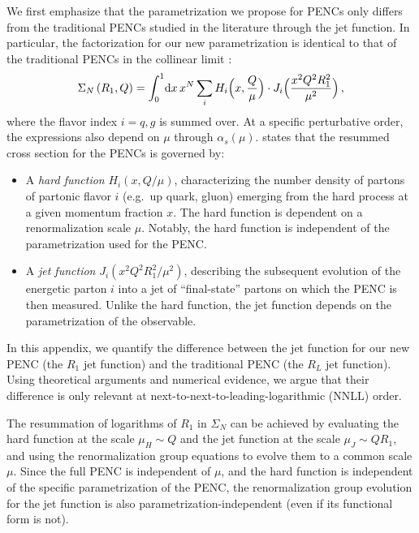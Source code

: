 We first emphasize that the parametrization we propose for PENCs only differs from the traditional PENCs studied in the literature through the jet function.
%
In particular, the factorization for our new parametrization is identical to that of the traditional PENCs in the collinear limit \cite{Dixon:2019uzg, Chen:2020vvp}:
\begin{align} \label{eq:fact}
    \Sigma_N
    \left(
    R_1, Q
    \right)
    =
    \int_0^1\!
    \dd x\,
    x^N
    \sum_i H_i
    \Bigl(x,\frac{Q}{\mu}\Bigr) \cdot
    J_i
    \Bigl( \frac{x^2 Q^2R_1^2}{\mu^2} \Bigr)
    \,,
\end{align}
where the flavor index \(i = q,g\)  is summed over.
%
At a specific perturbative order, the expressions also depend on $\mu$ through $\alpha_s(\mu)$.
%
 states that the resummed cross section for the PENCs %
is governed by:
\begin{itemize}
    \item
    A \textit{hard function} \(H_i(x, Q/\mu)\), characterizing the number density of partons of partonic flavor \(i\) (e.g.\ up quark, gluon) emerging from the hard process at a given momentum fraction \(x\).
    The hard function is dependent on a renormalization scale \(\mu\).
    Notably, the hard function is independent of the parametrization used for the PENC.

    \item
    A \textit{jet function} \(J_i( x^2 Q^2R_1^2/\mu^2 )\), describing the subsequent evolution of the energetic parton \(i\)
    into a jet of ``final-state'' partons on which the PENC is then measured.
    Unlike the hard function, the jet function depends on the parametrization of the observable.
\end{itemize}
%
In this appendix, we quantify the difference between the jet function for our new PENC (the \(R_1\) jet function) and the traditional PENC (the \(R_L\) jet function). Using theoretical arguments and numerical evidence, we argue that their difference is only relevant at next-to-next-to-leading-logarithmic (NNLL) order.

The resummation of logarithms of $R_1$ in $\Sigma_N$ can be achieved by evaluating the hard function at the scale $\mu_H \sim Q$ and the jet function at the scale $\mu_J \sim Q R_1$, and using the renormalization group equations to evolve them to a common scale $\mu$.
%
Since the full PENC is independent of \(\mu\), and the hard function is independent of the specific parametrization of the PENC, the renormalization group evolution for the jet function is also parametrization-independent (even if its functional form is not).

